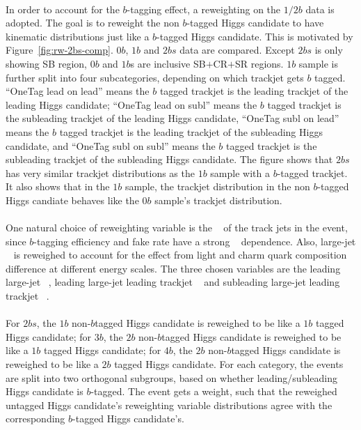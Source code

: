 \paragraph{}
In order to account for the $b$-tagging effect, a reweighting on the $1/2b$ data is adopted. 
The goal is to reweight the non $b$-tagged Higgs candidate to have kinematic distributions just like a $b$-tagged Higgs candidate. 
This is motivated by Figure~\ref{fig:rw-2bs-comp}.
$0b$, $1b$ and $2bs$ data are compared.
Except $2bs$ is only showing SB region, $0b$ and $1b$s are inclusive SB$+$CR$+$SR regions.
$1b$ sample is further split into four subcategories, depending on which trackjet gets $b$ tagged. 
``OneTag lead on lead'' means the $b$ tagged trackjet is the leading trackjet of the leading Higgs candidate;
``OneTag lead on subl'' means the $b$ tagged trackjet is the subleading trackjet of the leading Higgs candidate, 
``OneTag subl on lead'' means the $b$ tagged trackjet is the leading trackjet of the subleading Higgs candidate, 
and ``OneTag subl on subl'' means the $b$ tagged trackjet is the subleading trackjet of the subleading Higgs candidate.
The figure shows that $2bs$ has very similar trackjet \pt distributions as the $1b$ sample with a $b$-tagged trackjet.
It also shows that in the $1b$ sample, the trackjet \pt distribution in the non $b$-tagged Higgs candiate behaves like the $0b$ sample's trackjet \pt distribution.

\paragraph{}
One natural choice of reweighting variable is the \pt~ of the track jets in the event, since $b$-tagging efficiency and fake rate have a strong \pt~ dependence. 
Also, large-\R jet \pt~ is reweighed to account for the effect from light and charm quark composition difference at different energy scales.
The three chosen variables are the leading large-\R jet \pt~, leading large-\R jet leading trackjet \pt~ and subleading large-\R jet leading trackjet \pt~.

\paragraph{}
For $2bs$, the $1b$ non-$b$tagged Higgs candidate is reweighed to be like a $1b$ tagged Higgs candidate; for $3b$, the $2b$ non-$b$tagged Higgs candidate is reweighed to be like a $1b$ tagged Higgs candidate; for $4b$, the $2b$ non-$b$tagged Higgs candidate is reweighed to be like a $2b$ tagged Higgs candidate.
For each category, the events are split into two orthogonal subgroups, based on whether leading/subleading Higgs candidate is $b$-tagged. 
The event gets a weight, such that the reweighed untagged Higgs candidate's reweighting variable distributions agree with the corresponding $b$-tagged Higgs candidate's.

